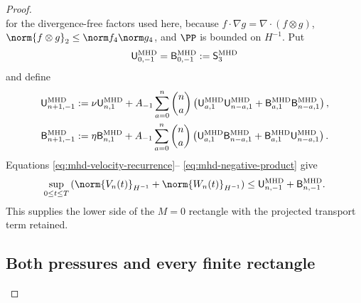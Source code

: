 \begin{proof}
\begin{equation}
 \label{eq:mhd-negative-product}
\end{equation}
for the divergence-free factors used here, because
\(f\cdot\nabla g=\nabla\cdot(f\otimes g)\),
\(\norm{f\otimes g}_2\le\norm f_4\norm g_4\), and \(\PP\) is bounded on
\(H^{-1}\).  Put
\begin{equation}
 \mathsf U_{0,-1}^{\rm MHD}
 =\mathsf B_{0,-1}^{\rm MHD}:=\mathsf S_3^{\rm MHD}
 \label{eq:mhd-negative-base}
\end{equation}
and define
\begin{align}
 \mathsf U_{n+1,-1}^{\rm MHD}
 &:={}\nu\mathsf U_{n,1}^{\rm MHD}
 +A_{-1}\sum_{a=0}^n\binom na\left(
  \mathsf U_{a,1}^{\rm MHD}\mathsf U_{n-a,1}^{\rm MHD}
  +\mathsf B_{a,1}^{\rm MHD}\mathsf B_{n-a,1}^{\rm MHD}
 \right),
 \label{eq:mhd-negative-velocity-envelope}\\
 \mathsf B_{n+1,-1}^{\rm MHD}
 &:={}\eta\mathsf B_{n,1}^{\rm MHD}
 +A_{-1}\sum_{a=0}^n\binom na\left(
  \mathsf U_{a,1}^{\rm MHD}\mathsf B_{n-a,1}^{\rm MHD}
  +\mathsf B_{a,1}^{\rm MHD}\mathsf U_{n-a,1}^{\rm MHD}
 \right).
 \label{eq:mhd-negative-magnetic-envelope}
\end{align}
Equations \eqref{eq:mhd-velocity-recurrence}--
\eqref{eq:mhd-negative-product} give
\begin{equation}
 \sup_{0\le t\le T}
 \left(\norm{V_n(t)}_{H^{-1}}+\norm{W_n(t)}_{H^{-1}}\right)
 \le\mathsf U_{n,-1}^{\rm MHD}+\mathsf B_{n,-1}^{\rm MHD}.
 \label{eq:mhd-negative-bound}
\end{equation}
This supplies the lower side of the \(M=0\) rectangle with the projected
transport term retained.

\subsection{Both pressures and every finite rectangle}


\end{proof}
